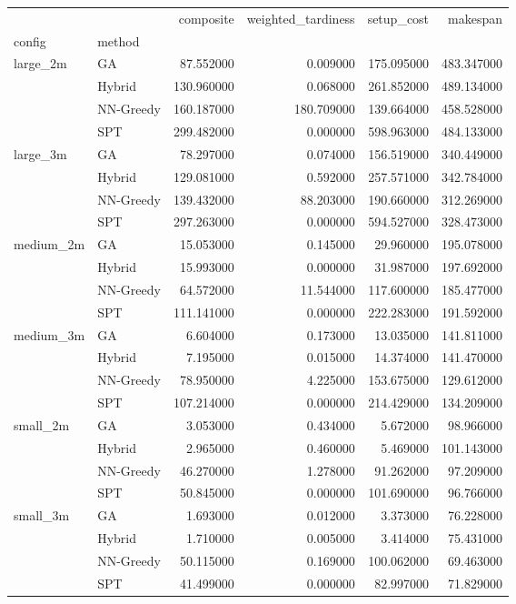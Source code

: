 \begin{tabular}{llrrrr}
\toprule
 &  & composite & weighted_tardiness & setup_cost & makespan \\
config & method &  &  &  &  \\
\midrule
\multirow[t]{4}{*}{large_2m} & GA & 87.552000 & 0.009000 & 175.095000 & 483.347000 \\
 & Hybrid & 130.960000 & 0.068000 & 261.852000 & 489.134000 \\
 & NN-Greedy & 160.187000 & 180.709000 & 139.664000 & 458.528000 \\
 & SPT & 299.482000 & 0.000000 & 598.963000 & 484.133000 \\
\cline{1-6}
\multirow[t]{4}{*}{large_3m} & GA & 78.297000 & 0.074000 & 156.519000 & 340.449000 \\
 & Hybrid & 129.081000 & 0.592000 & 257.571000 & 342.784000 \\
 & NN-Greedy & 139.432000 & 88.203000 & 190.660000 & 312.269000 \\
 & SPT & 297.263000 & 0.000000 & 594.527000 & 328.473000 \\
\cline{1-6}
\multirow[t]{4}{*}{medium_2m} & GA & 15.053000 & 0.145000 & 29.960000 & 195.078000 \\
 & Hybrid & 15.993000 & 0.000000 & 31.987000 & 197.692000 \\
 & NN-Greedy & 64.572000 & 11.544000 & 117.600000 & 185.477000 \\
 & SPT & 111.141000 & 0.000000 & 222.283000 & 191.592000 \\
\cline{1-6}
\multirow[t]{4}{*}{medium_3m} & GA & 6.604000 & 0.173000 & 13.035000 & 141.811000 \\
 & Hybrid & 7.195000 & 0.015000 & 14.374000 & 141.470000 \\
 & NN-Greedy & 78.950000 & 4.225000 & 153.675000 & 129.612000 \\
 & SPT & 107.214000 & 0.000000 & 214.429000 & 134.209000 \\
\cline{1-6}
\multirow[t]{4}{*}{small_2m} & GA & 3.053000 & 0.434000 & 5.672000 & 98.966000 \\
 & Hybrid & 2.965000 & 0.460000 & 5.469000 & 101.143000 \\
 & NN-Greedy & 46.270000 & 1.278000 & 91.262000 & 97.209000 \\
 & SPT & 50.845000 & 0.000000 & 101.690000 & 96.766000 \\
\cline{1-6}
\multirow[t]{4}{*}{small_3m} & GA & 1.693000 & 0.012000 & 3.373000 & 76.228000 \\
 & Hybrid & 1.710000 & 0.005000 & 3.414000 & 75.431000 \\
 & NN-Greedy & 50.115000 & 0.169000 & 100.062000 & 69.463000 \\
 & SPT & 41.499000 & 0.000000 & 82.997000 & 71.829000 \\
\cline{1-6}
\bottomrule
\end{tabular}
